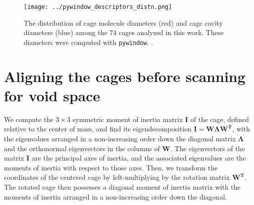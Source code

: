 \documentclass[journal=jacsat,manuscript=article]{achemso}
\begin{document}
\begin{figure}
\centering
	\texttt{[image: ../pywindow\_descriptors\_distn.png]}
	\caption{The distribution of cage molecule diameters (red) and cage cavity diameters (blue) among the 74 cages analyzed in this work. These diameters were computed with \texttt{pywindow}. \cite{miklitz2018pywindow}.
	} \label{fig:pywindow_descriptors_distn}
\end{figure}

\newpage
\clearpage

\section{Aligning the cages before scanning for void space} 
\label{sec:alignment_details}
We compute the $3\times 3$ symmetric moment of inertia matrix $\mathbf{I}$ of the cage, defined relative to the center of mass, and find its eigendecomposition $\mathbf{I}=\mathbf{W}\mathbf{\Lambda}\mathbf{W^T}$, with the eigenvalues arranged in a non-increasing order down the diagonal matrix $\mathbf{\Lambda}$ and the orthonormal eigenvectors in the columns of $\mathbf{W}$. {\color{red} The eigenvectors of the matrix $\mathbf{I}$ are the principal axes of inertia, and the associated eigenvalues are the moments of inertia with respect to those axes.} Then, we transform the coordinates of the centered cage by left-multiplying by the rotation matrix $\mathbf{W^T}$. The rotated cage then possesses a diagonal moment of inertia matrix with the moments of inertia arranged in a non-increasing order down the diagonal.
\end{document}
